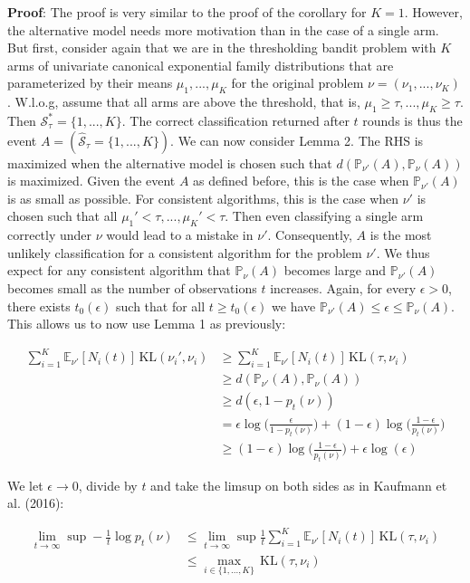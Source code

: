 \documentclass[12pt,]{article}
\newcommand{\KL}{\,\text{KL}}
\begin{document}
\textbf{Proof}: The proof is very similar to the proof of the corollary
for \(K=1\). However, the alternative model needs more motivation than
in the case of a single arm. But first, consider again that we are in
the thresholding bandit problem with \(K\) arms of univariate canonical
exponential family distributions that are parameterized by their means
\(\mu_1, ..., \mu_K\) for the original problem
\(\nu = (\nu_1, ..., \nu_K)\). W.l.o.g, assume that all arms are above
the threshold, that is, \(\mu_1 \geq \tau, ..., \mu_K \geq \tau\). Then
\(\mathcal{S}_{\tau}^* = \{1, ... , K\}\). The correct classification
returned after \(t\) rounds is thus the event
\(A = (\hat{\mathcal{S}}_{\tau} = \{1, ..., K\})\). We can now consider
Lemma 2. The RHS is maximized when the alternative model is chosen such
that \(d(\mathbb{P}_{\nu'}(A), \mathbb{P}_{\nu}(A))\) is maximized.
Given the event \(A\) as defined before, this is the case when
\(\mathbb{P}_{\nu'}(A)\) is as small as possible. For consistent
algorithms, this is the case when \(\nu'\) is chosen such that all
\(\mu_1' < \tau, ..., \mu_K' < \tau\). Then even classifying a single
arm correctly under \(\nu\) would lead to a mistake in \(\nu'\).
Consequently, \(A\) is the most unlikely classification for a consistent
algorithm for the problem \(\nu'\). We thus expect for any consistent
algorithm that \(\mathbb{P}_{\nu}(A)\) becomes large and
\(\mathbb{P}_{\nu'}(A)\) becomes small as the number of observations
\(t\) increases. Again, for every \(\epsilon > 0\), there exists
\(t_0(\epsilon)\) such that for all \(t \geq t_0(\epsilon)\) we have
\(\mathbb{P}_{\nu'}(A) \leq \epsilon \leq \mathbb{P}_\nu(A)\). This
allows us to now use Lemma 1 as previously:

\begin{align*}
\sum_{i=1}^K \mathbb{E}_{\nu'}[N_i(t)]\KL(\nu_i', \nu_i) & \geq \sum_{i=1}^K \mathbb{E}_{\nu'}[N_i(t)]\KL(\tau, \nu_i) \\
& \geq d(\mathbb{P}_{\nu'}(A), \mathbb{P}_{\nu}(A)) \\
& \geq d(\epsilon, 1-p_t(\nu)) \\
& = \epsilon \log \Big(\frac{\epsilon}{1-p_t(\nu)}\Big) + (1-\epsilon) \log \Big( \frac{1-\epsilon}{p_t(\nu)}\Big) \\
& \geq (1-\epsilon) \log \Big(\frac{1-\epsilon}{p_t(\nu)}\Big) + \epsilon \log(\epsilon)
\end{align*}

We let \(\epsilon \rightarrow 0\), divide by \(t\) and take the limsup
on both sides as in Kaufmann et al. (2016):

\begin{align*}
\lim_{t \rightarrow \infty} \sup - \frac{1}{t} \log p_t(\nu) & \leq \lim_{t \rightarrow \infty} \sup \frac{1}{t} \sum_{i=1}^K \mathbb{E}_{\nu'}[N_i(t)]\KL(\tau, \nu_i) \\
& \leq \max_{i \in \{1,...,K\}} \KL(\tau, \nu_i)
\end{align*}
\end{document}
